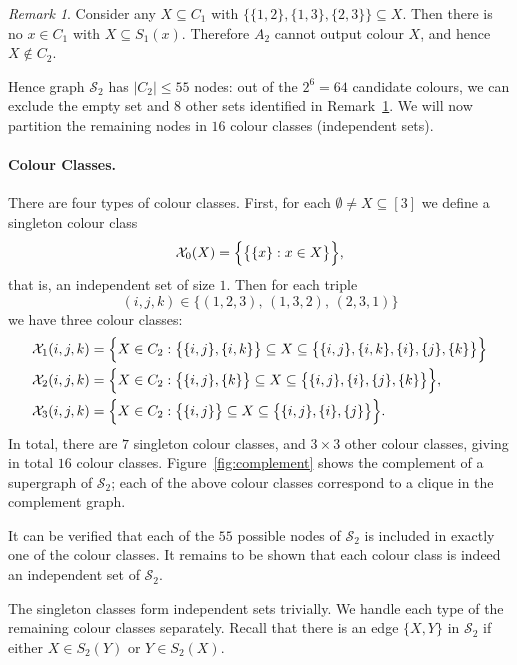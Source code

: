 \documentclass[a4paper,11pt]{article}
\theoremstyle{remark}
\newtheorem{remark}{Remark}
\newcommand{\cS}{\mathcal{S}}
\begin{document}
\begin{remark}\label{remark:nodes}
Consider any $X \subseteq C_1$ with $\bigl\{\{1,2\},\{1,3\},\{2,3\}\bigr\} \subseteq X$. Then there is no $x \in C_1$ with $X \subseteq S_1(x)$. Therefore $A_2$ cannot output colour $X$, and hence $X \notin C_2$.
\end{remark}

Hence graph $\cS_2$ has $|C_2| \le 55$ nodes: out of the $2^6 = 64$ candidate colours, we can exclude the empty set and $8$ other sets identified in Remark~\ref{remark:nodes}. We will now partition the remaining nodes in $16$ colour classes (independent sets).

\paragraph{Colour Classes.} 

There are four types of colour classes. First, for each $\emptyset \ne X \subseteq [3]$ we define a singleton colour class
\[
    \mathcal{X}_0(X) = \Bigl\{ \bigl\{ \{x\} : x \in X \bigr\} \Bigr\},
\]
that is, an independent set of size $1$. Then for each triple
\[
    (i,j,k) \in \bigl\{ (1,2,3),\, (1,3,2),\, (2,3,1) \}
\]
we have three colour classes:
\begin{align*}
\mathcal{X}_1(i,j,k) &= \Bigl\{ X \in C_2 : \bigl\{ \{i,j\}, \{i,k\} \bigr\} \subseteq X \subseteq  \bigl\{ \{i,j\}, \{i,k\}, \{i\}, \{j\}, \{k\} \bigr\} \Bigr\} \\
\mathcal{X}_2(i,j,k) &= \Bigl\{ X \in C_2 : \bigl\{ \{i,j\}, \{k\} \bigr\} \subseteq X \subseteq  \bigl\{ \{i,j\}, \{i\}, \{j\}, \{k\} \bigr\} \Bigr\}, \\
\mathcal{X}_3(i,j,k) &= \Bigl\{ X \in C_2 : \bigl\{ \{i,j\} \bigr\} \subseteq X \subseteq  \bigl\{ \{i,j\}, \{i\}, \{j\} \bigr\} \Bigr\}.
\end{align*}
In total, there are $7$ singleton colour classes, and $3 \times 3$ other colour classes, giving in total $16$ colour classes. Figure~\ref{fig:complement} shows the complement of a supergraph of $\cS_2$; each of the above colour classes correspond to a clique in the complement graph.

It can be verified that each of the $55$ possible nodes of $\cS_2$ is included in exactly one of the colour classes. It remains to be shown that each colour class is indeed an independent set of $\cS_2$.

The singleton classes form independent sets trivially. We handle each type of the remaining colour classes separately. Recall that there is an edge $\{X,Y\}$ in $\cS_2$ if either $X \in S_2(Y)$ or $Y \in S_2(X)$. 
\end{document}
